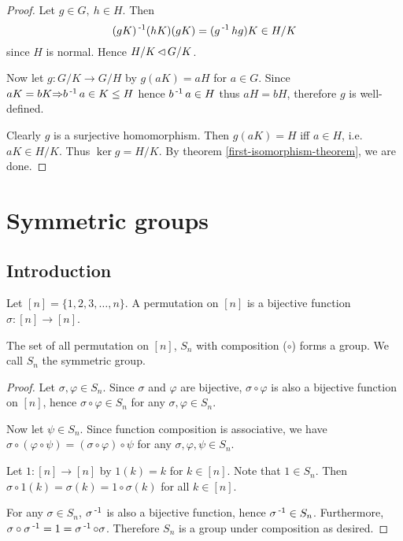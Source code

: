 \documentclass[12pt]{article}
\begin{document}
	\begin{proof}
		Let $g\in G,\ h\in H$. Then
		$$(gK)\operatorname{^{-1}} (hK) (gK) = (g\operatorname{^{-1}} h g)K \in H/K$$
		since $H$ is normal. Hence $H/K \operatorname{\vartriangleleft} G/K$.

		Now let $g: G/K \to G/H$ by $g(aK) = aH$ for $a\in G$. Since $aK=bK {\Rightarrow} b\operatorname{^{-1}} a \in K \leq H$ hence $b\operatorname{^{-1}} a\in H$ thus $aH=bH$, therefore $g$ is well-defined.

		Clearly $g$ is a surjective homomorphism. Then $g(aK) = H$ iff $a\in H$, i.e. $aK \in H/K$. Thus $\ker g = H/K$. By theorem \ref{first-isomorphism-theorem}, we are done.
	\end{proof}

\newpage
\section{Symmetric groups}

\subsection{Introduction}
	\begin{define}
		Let $[n] = \{1,2,3,\dots,n\}$. A permutation on $[n]$ is a bijective function $\sigma: [n] \to [n]$.
	\end{define}

	\begin{theorem}
		The set of all permutation on $[n]$, $S_n$ with composition ($\circ$) forms a group. We call $S_n$ the symmetric group.
	\end{theorem}
	\begin{proof}
		Let $\sigma,\varphi\in S_n$. Since $\sigma$ and $\varphi$ are bijective, $\sigma \circ \varphi$ is also a bijective function on $[n]$, hence $\sigma \circ \varphi \in S_n$ for any $\sigma, \varphi \in S_n$.

		Now let $\psi \in S_n$. Since function composition is associative, we have $\sigma \circ (\varphi \circ \psi) = (\sigma \circ \varphi) \circ \psi$ for any $\sigma, \varphi, \psi \in S_n$.

		Let $1 : [n] \to [n]$ by $1(k) = k$ for $k\in [n]$. Note that $1\in S_n$. Then $\sigma \circ 1 (k) = \sigma(k) = 1\circ \sigma(k)$ for all $k\in [n]$.

		For any $\sigma \in S_n$, $\sigma\operatorname{^{-1}}$ is also a bijective function, hence $\sigma\operatorname{^{-1}} \in S_n$. Furthermore, $\sigma \circ \sigma\operatorname{^{-1}} = 1 = \sigma\operatorname{^{-1}} \circ \sigma$. Therefore $S_n$ is a group under composition as desired.
	\end{proof}
\end{document}
